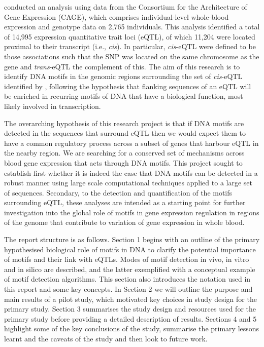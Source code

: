 \documentclass[12pt]{article}
\begin{document}
\citet{lloyd2017genetic} conducted an analysis using data from the Consortium for the Architecture of Gene Expression (CAGE), which comprises individual-level whole-blood expression and genotype data on 2,765 individuals. This analysis identified a total of 14,995 expression quantitative trait loci (eQTL), of which 11,204  were located proximal to their transcript (i.e., \emph{cis}). In particular, \emph{cis}-eQTL were defined to be those associations such that the SNP was located on the same chromosome as the gene and \emph{trans}-eQTL the complement of this. The aim of this research is to identify DNA motifs in the genomic regions surrounding the set of \emph{cis}-eQTL identified by \citet{lloyd2017genetic}, following the hypothesis that flanking sequences of an eQTL will be enriched in recurring motifs of DNA that have a biological function, most likely involved in transcription.

The overarching hypothesis of this research project is that if DNA motifs are detected in the sequences that surround eQTL then we would expect them to have a common regulatory process across a subset of genes that harbour eQTL in the nearby region. We are searching for a conserved set of mechanisms across blood gene expression that acts through DNA motifs. This project sought to establish first whether it is indeed the case that DNA motifs can be detected in a robust manner using large scale computational techniques applied to a large set of sequences. Secondary, to the detection and quantification of the motifs surrounding eQTL, these analyses are intended as a starting point for further investigation into the global role of motifs in  gene expression regulation in regions of the genome that contribute to variation of gene expression in whole blood. 

The report structure is as follows. Section 1 begins with an outline of the 
primary hypothesised biological role of motifs in DNA to clarify the potential importance of motifs and their link with eQTLs. Modes of motif detection in vivo, in vitro and in silico are described, and the latter exemplified with a conceptual example of motif detection algorithms. This section also introduces the notation used in this report and some key concepts. In Section 2 we will outline the purpose and main results of a pilot study, which motivated key choices in study design for the primary study.  Section 3 summarises the study design and resources used for the primary study before providing a detailed description of results. Sections 4 and 5 highlight some of the key conclusions of the study, summarise the primary lessons learnt and the caveats of the study and then look to future work. 
 
\end{document}
